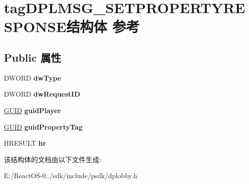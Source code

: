\hypertarget{structtag_d_p_l_m_s_g___s_e_t_p_r_o_p_e_r_t_y_r_e_s_p_o_n_s_e}{}\section{tag\+D\+P\+L\+M\+S\+G\+\_\+\+S\+E\+T\+P\+R\+O\+P\+E\+R\+T\+Y\+R\+E\+S\+P\+O\+N\+S\+E结构体 参考}
\label{structtag_d_p_l_m_s_g___s_e_t_p_r_o_p_e_r_t_y_r_e_s_p_o_n_s_e}
\subsection*{Public 属性}
\begin{DoxyCompactItemize}
\item 
\mbox{\label{structtag_d_p_l_m_s_g___s_e_t_p_r_o_p_e_r_t_y_r_e_s_p_o_n_s_e_a1a16509a22fa984c9808ab8201085346}} 
D\+W\+O\+RD {\bfseries dw\+Type}
\item 
\mbox{\label{structtag_d_p_l_m_s_g___s_e_t_p_r_o_p_e_r_t_y_r_e_s_p_o_n_s_e_a4b392ebac1fcf4dd6654ca6a4eb5b038}} 
D\+W\+O\+RD {\bfseries dw\+Request\+ID}
\item 
\mbox{\label{structtag_d_p_l_m_s_g___s_e_t_p_r_o_p_e_r_t_y_r_e_s_p_o_n_s_e_a2c18a76653f579880c6f4dcdd5e0aca0}} 
\hyperlink{interface_g_u_i_d}{G\+U\+ID} {\bfseries guid\+Player}
\item 
\mbox{\label{structtag_d_p_l_m_s_g___s_e_t_p_r_o_p_e_r_t_y_r_e_s_p_o_n_s_e_ace05eb43354ac99ccf5833a406a2c5e2}} 
\hyperlink{interface_g_u_i_d}{G\+U\+ID} {\bfseries guid\+Property\+Tag}
\item 
\mbox{\label{structtag_d_p_l_m_s_g___s_e_t_p_r_o_p_e_r_t_y_r_e_s_p_o_n_s_e_a1358b40f941f0a29767646c90b3bea93}} 
H\+R\+E\+S\+U\+LT {\bfseries hr}
\end{DoxyCompactItemize}


该结构体的文档由以下文件生成\+:\begin{DoxyCompactItemize}
\item 
E\+:/\+React\+O\+S-\/0../sdk/include/psdk/dplobby.\+h\end{DoxyCompactItemize}
